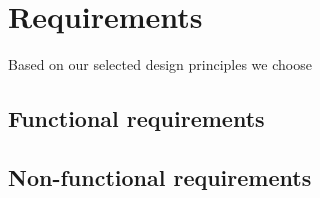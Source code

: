 \section{Requirements}

Based on our selected design principles we choose

\subsection{Functional requirements}
\subsection{Non-functional requirements}











